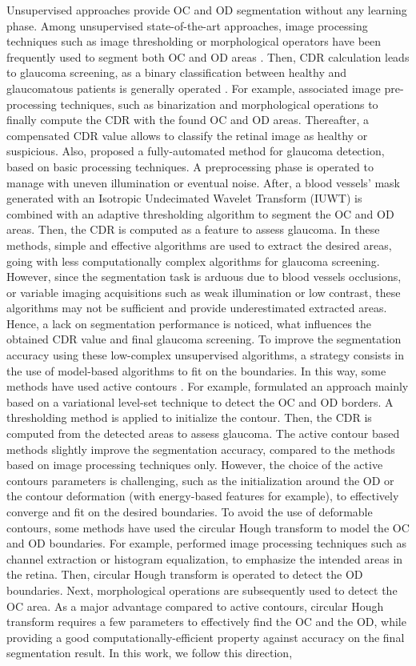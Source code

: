 Unsupervised approaches provide OC and OD segmentation without any learning phase. Among unsupervised state-of-the-art approaches, image processing techniques such as image thresholding or morphological operators have been frequently used to segment both OC and OD areas \citep{aquino,stapor}. Then, CDR calculation leads to glaucoma screening, as a binary classification between healthy and glaucomatous patients is generally operated \citep{singh2}.
For example, \citet{singh} associated image pre-processing techniques, such as binarization and morphological operations to finally compute the CDR with the found OC and OD areas. Thereafter, a compensated CDR value allows to classify the retinal image as healthy or suspicious. Also, \citet{guerre} proposed a fully-automated method for glaucoma detection, based on basic processing techniques. A preprocessing phase is operated to manage with uneven illumination or eventual noise. After, a blood vessels' mask generated with an Isotropic Undecimated Wavelet Transform (IUWT) is combined with an adaptive thresholding algorithm to segment the OC and OD areas. Then, the CDR is computed as a feature to assess glaucoma.
In these methods, simple and effective algorithms are used to extract the desired areas, going with less computationally complex algorithms for glaucoma screening. However, since the segmentation task is arduous due to blood vessels occlusions, or variable imaging acquisitions such as weak illumination or low contrast, these algorithms may not be sufficient and provide underestimated extracted areas. Hence, a lack on segmentation performance is noticed, what influences the obtained CDR value and final glaucoma screening. 
To improve the segmentation accuracy using these low-complex unsupervised algorithms, a strategy consists in the use of model-based algorithms to fit on the boundaries.
In this way, some methods have used active contours \citep{joshi}. For example, \citet{cdr} formulated an approach mainly based on a variational level-set technique to detect the OC and OD borders. A thresholding method is applied to initialize the contour. Then, the CDR is computed from the detected areas to assess glaucoma.
The active contour based methods slightly improve the segmentation accuracy, compared to the methods based on image processing techniques only. However, the choice of the active contours parameters is challenging, such as the initialization around the OD or the contour deformation (with energy-based features for example), to effectively converge and fit on the desired boundaries. 
To avoid the use of deformable contours, some methods have used the circular Hough transform \citep{pedersen} to model the OC and OD boundaries. For example, \citet{priyadharsini} performed image processing techniques such as channel extraction or histogram equalization, to emphasize the intended areas in the retina. Then, circular Hough transform is operated to detect the OD boundaries. Next, morphological operations are subsequently used to detect the OC area. As a major advantage compared to active contours, circular Hough transform requires a few parameters to effectively find the OC and the OD, while providing a good computationally-efficient property against accuracy on the final segmentation result. In this work, we follow this direction, 

